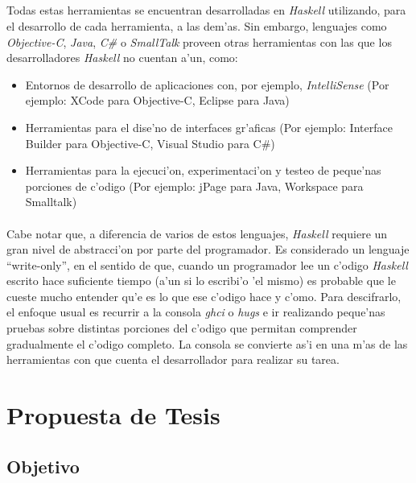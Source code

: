 \documentclass[a4paper]{article}
\begin{document}
\subparagraph{}Todas estas herramientas se encuentran desarrolladas en \textit{Haskell} utilizando, para el desarrollo de cada herramienta, a las dem'as.  Sin embargo, lenguajes como \textit{Objective-C}, \textit{Java}, \textit{C\#} o \textit{SmallTalk} proveen otras herramientas con las que los desarrolladores \textit{Haskell} no cuentan a'un, como:
\begin{itemize}
\item Entornos de desarrollo de aplicaciones con, por ejemplo, \textsl{IntelliSense} (Por ejemplo: XCode para Objective-C, Eclipse para Java)
\item Herramientas para el dise'no de interfaces gr'aficas (Por ejemplo: Interface Builder para Objective-C, Visual Studio para C\#)
\item Herramientas para la ejecuci'on, experimentaci'on y testeo de peque'nas porciones de c'odigo (Por ejemplo: jPage para Java, Workspace para Smalltalk)
\end{itemize}
\paragraph{}Cabe notar que, a diferencia de varios de estos lenguajes, \textit{Haskell} requiere un gran nivel de abstracci'on por parte del programador.  Es considerado un lenguaje ``write-only'', en el sentido de que, cuando un programador lee un c'odigo \textit{Haskell} escrito hace suficiente tiempo (a'un si lo escribi'o 'el mismo) es probable que le cueste mucho entender qu'e es lo que ese c'odigo hace y c'omo.  Para descifrarlo, el enfoque usual es recurrir a la consola \textsl{ghci} o \textsl{hugs} e ir realizando peque'nas pruebas sobre distintas porciones del c'odigo que permitan comprender gradualmente el c'odigo completo.  La consola se convierte as'i en una m'as de las herramientas con que cuenta el desarrollador para realizar su tarea.

\section{Propuesta de Tesis}
\subsection{Objetivo}
\end{document}
